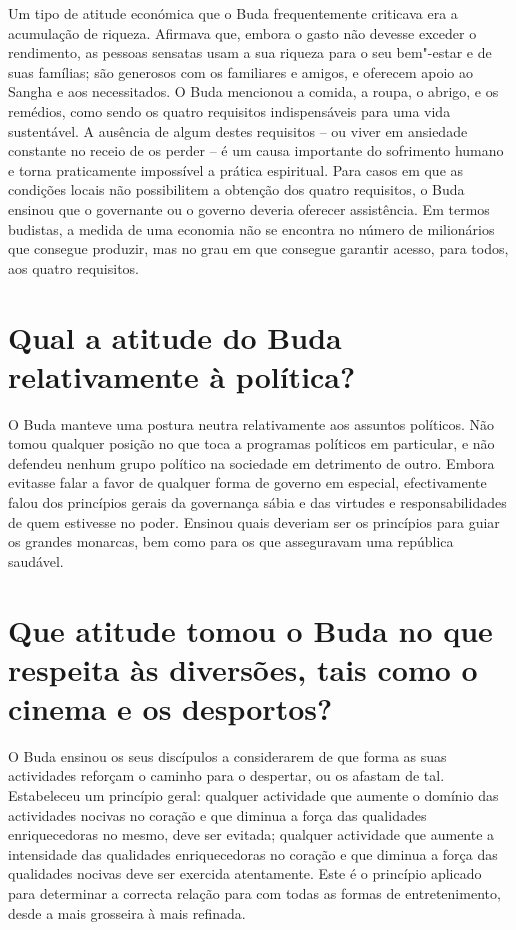 Um tipo de atitude económica que o Buda frequentemente criticava era a
acumulação de riqueza. Afirmava que, embora o gasto não devesse exceder
o rendimento, as pessoas sensatas usam a sua riqueza para o seu
bem"-estar e de suas famílias; são generosos com os familiares e amigos,
e oferecem apoio ao Sangha e aos necessitados. O Buda mencionou a
comida, a roupa, o abrigo, e os remédios, como sendo os quatro
requisitos indispensáveis para uma vida sustentável. A ausência de algum
destes requisitos -- ou viver em ansiedade constante no receio de os
perder -- é um causa importante do sofrimento humano e torna
praticamente impossível a prática espiritual. Para casos em que as
condições locais não possibilitem a obtenção dos quatro requisitos, o
Buda ensinou que o governante ou o governo deveria oferecer assistência.
Em termos budistas, a medida de uma economia não se encontra no número
de milionários que consegue produzir, mas no grau em que consegue
garantir acesso, para todos, aos quatro requisitos.

\section{Qual a atitude do Buda relativamente à política?}

O Buda manteve uma postura neutra relativamente aos assuntos políticos.
Não tomou qualquer posição no que toca a programas políticos em
particular, e não defendeu nenhum grupo político na sociedade em
detrimento de outro. Embora evitasse falar a favor de qualquer forma de
governo em especial, efectivamente falou dos princípios gerais da
governança sábia e das virtudes e responsabilidades de quem estivesse no
poder. Ensinou quais deveriam ser os princípios para guiar os grandes
monarcas, bem como para os que asseguravam uma república saudável.

\section{Que atitude tomou o Buda no que respeita às diversões, tais como o
  cinema e os desportos?}

O Buda ensinou os seus discípulos a considerarem de que forma as suas
actividades reforçam o caminho para o despertar, ou os afastam de tal.
Estabeleceu um princípio geral: qualquer actividade que aumente o
domínio das actividades nocivas no coração e que diminua a força das
qualidades enriquecedoras no mesmo, deve ser evitada; qualquer
actividade que aumente a intensidade das qualidades enriquecedoras no
coração e que diminua a força das qualidades nocivas deve ser exercida
atentamente. Este é o princípio aplicado para determinar a correcta
relação para com todas as formas de entretenimento, desde a mais
grosseira à mais refinada.

